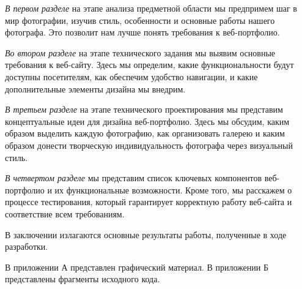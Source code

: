 \emph{В первом разделе} на этапе анализа предметной области мы предпримем шаг в мир фотографии, изучив стиль, особенности и основные работы нашего фотографа. Это позволит нам лучше понять требования к веб-портфолио.

\emph{Во втором разделе} на этапе технического задания мы выявим основные требования к веб-сайту. Здесь мы определим, какие функциональности будут доступны посетителям, как обеспечим удобство навигации, и какие дополнительные элементы дизайна мы внедрим.

\emph{В третьем разделе} на этапе технического проектирования мы представим концептуальные идеи для дизайна веб-портфолио. Здесь мы обсудим, каким образом выделить каждую фотографию, как организовать галерею и каким образом донести творческую индивидуальность фотографа через визуальный стиль.

\emph{В четвертом разделе} мы представим список ключевых компонентов веб-портфолио и их функциональные возможности. Кроме того, мы расскажем о процессе тестирования, который гарантирует корректную работу веб-сайта и соответствие всем требованиям.

В заключении излагаются основные результаты работы, полученные в ходе разработки.

В приложении А представлен графический материал.
В приложении Б представлены фрагменты исходного кода. 
